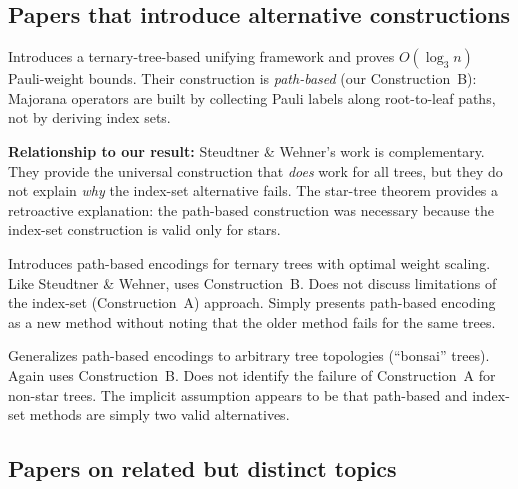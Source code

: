\documentclass[11pt,a4paper]{article}
\theoremstyle{definition}
\begin{document}
\subsection{Papers that introduce alternative constructions}

\begin{description}[leftmargin=1.5cm]
  \item[Steudtner \& Wehner (2018)~\cite{steudtner2018}.]
    Introduces a ternary-tree-based unifying framework and proves
    $O(\log_3 n)$ Pauli-weight bounds.  Their construction is
    \emph{path-based} (our Construction~B): Majorana operators are
    built by collecting Pauli labels along root-to-leaf paths, not by
    deriving index sets.

    \textbf{Relationship to our result:} Steudtner \& Wehner's work
    is complementary.  They provide the universal construction that
    \emph{does} work for all trees, but they do not explain \emph{why}
    the index-set alternative fails.  The star-tree theorem provides a
    retroactive explanation: the path-based construction was necessary
    because the index-set construction is valid only for stars.

  \item[Jiang et al.\ (2020)~\cite{jiang2020}.]
    Introduces path-based encodings for ternary trees with optimal
    weight scaling.  Like Steudtner \& Wehner, uses Construction~B.
    Does not discuss limitations of the index-set (Construction~A)
    approach.  Simply presents path-based encoding as a new method
    without noting that the older method fails for the same trees.

  \item[Miller et al.\ (2023, Bonsai)~\cite{miller2023bonsai}.]
    Generalizes path-based encodings to arbitrary tree topologies
    (``bonsai'' trees).  Again uses Construction~B.  Does not identify
    the failure of Construction~A for non-star trees.  The implicit
    assumption appears to be that path-based and index-set methods
    are simply two valid alternatives.
\end{description}

\subsection{Papers on related but distinct topics}
\end{document}
